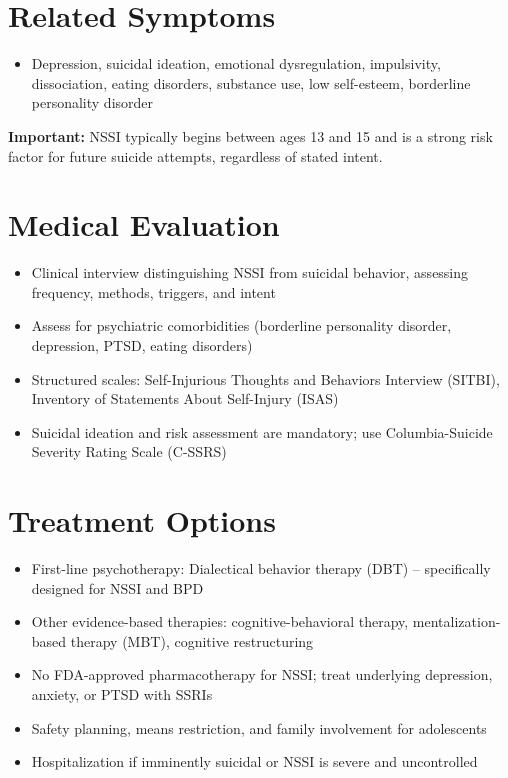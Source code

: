 \section*{Related Symptoms}
\begin{itemize}
  \item Depression, suicidal ideation, emotional dysregulation, impulsivity, dissociation, eating disorders, substance use, low self-esteem, borderline personality disorder
\end{itemize}
\textbf{Important:} NSSI typically begins between ages 13 and 15 and is a strong risk factor for future suicide attempts, regardless of stated intent.

\section*{Medical Evaluation}
\begin{itemize}
  \item Clinical interview distinguishing NSSI from suicidal behavior, assessing frequency, methods, triggers, and intent
  \item Assess for psychiatric comorbidities (borderline personality disorder, depression, PTSD, eating disorders)
  \item Structured scales: Self-Injurious Thoughts and Behaviors Interview (SITBI), Inventory of Statements About Self-Injury (ISAS)
  \item Suicidal ideation and risk assessment are mandatory; use Columbia-Suicide Severity Rating Scale (C-SSRS)
\end{itemize}

\section*{Treatment Options}
\begin{itemize}
  \item First-line psychotherapy: Dialectical behavior therapy (DBT) -- specifically designed for NSSI and BPD
  \item Other evidence-based therapies: cognitive-behavioral therapy, mentalization-based therapy (MBT), cognitive restructuring
  \item No FDA-approved pharmacotherapy for NSSI; treat underlying depression, anxiety, or PTSD with SSRIs
  \item Safety planning, means restriction, and family involvement for adolescents
  \item Hospitalization if imminently suicidal or NSSI is severe and uncontrolled
\end{itemize}

